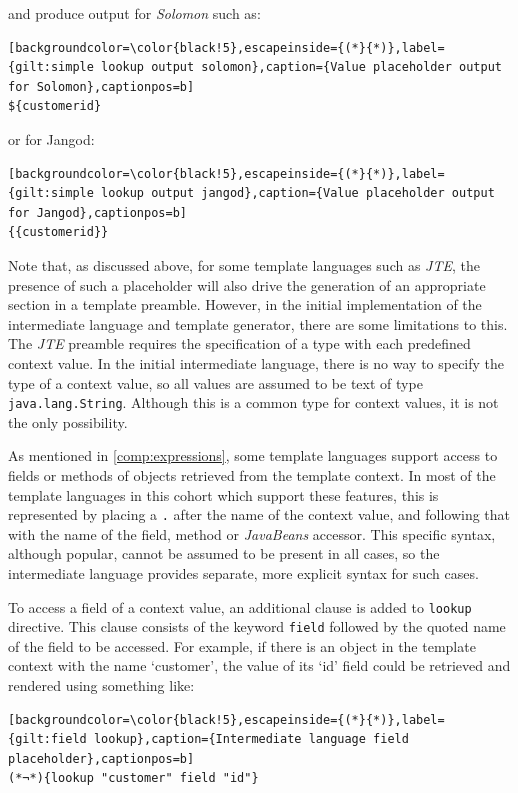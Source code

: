 and produce output for \emph{Solomon} such as:

\begin{lstlisting}[backgroundcolor=\color{black!5},escapeinside={(*}{*)},label={gilt:simple lookup output solomon},caption={Value placeholder output for Solomon},captionpos=b]
${customerid}
\end{lstlisting}

or for Jangod:

\begin{lstlisting}[backgroundcolor=\color{black!5},escapeinside={(*}{*)},label={gilt:simple lookup output jangod},caption={Value placeholder output for Jangod},captionpos=b]
{{customerid}}
\end{lstlisting}

Note that, as discussed above, for some template languages such as \emph{JTE}, the presence of such a placeholder will also drive the generation of an appropriate section in a template preamble. However, in the initial implementation of the intermediate language and template generator, there are some limitations to this. The \emph{JTE} preamble requires the specification of a type with each predefined context value. In the initial intermediate language, there is no way to specify the type of a context value, so all values are assumed to be text of type \verb!java.lang.String!. Although this is a common type for context values, it is not the only possibility.

As mentioned in \autoref{comp:expressions}, some template languages support access to fields or methods of objects retrieved from the template context. In most of the template languages in this cohort which support these features, this is represented by placing a \verb!.! after the name of the context value, and following that with the name of the field, method or \emph{JavaBeans} accessor. This specific syntax, although popular, cannot be assumed to be present in all cases, so the intermediate language provides separate, more explicit syntax for such cases.

To access a field of a context value, an additional clause is added to \verb!lookup! directive. This clause consists of the keyword \verb!field! followed by the quoted name of the field to be accessed. For example, if there is an object in the template context with the name `customer', the value of its `id' field could be retrieved and rendered using something like:

\begin{lstlisting}[backgroundcolor=\color{black!5},escapeinside={(*}{*)},label={gilt:field lookup},caption={Intermediate language field placeholder},captionpos=b]
(*¬*){lookup "customer" field "id"}
\end{lstlisting}

